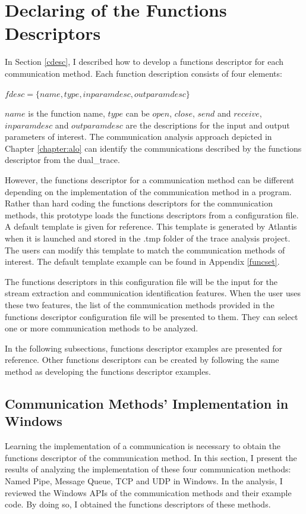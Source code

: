 \section{Declaring of the Functions Descriptors}\label{functionset}
In Section \ref{cdesc}, I described how to develop a functions descriptor for each communication method. Each function description consists of four elements: 

$fdesc = \lbrace name, type, inparamdesc, outparamdesc \rbrace$

$name$ is the function name, $type$ can be $open$, $close$, $send$ and $receive$, $inparamdesc$ and $outparamdesc$ are the descriptions for the input and output parameters of interest. The communication analysis approach depicted in Chapter \ref{chapter:alo} can identify the communications described by the functions descriptor from the dual\_trace.

However, the functions descriptor for a communication method can be different depending on the implementation of the communication method in a program. Rather than hard coding the functions descriptors for the communication methods, this prototype loads the functions descriptors from a configuration file. A default template is given for reference. This template is generated by Atlantis when it is launched and stored in the .tmp folder of the trace analysis project. The users can modify this template to match the communication methods of interest. The default template example can be found in Appendix \ref{funcset}.

The functions descriptors in this configuration file will be the input for the stream extraction and communication identification features. When the user uses these two features, the list of the communication methods provided in the functions descriptor configuration file will be presented to them. They can select one or more communication methods to be analyzed. 

In the following subsections, functions descriptor examples are presented for reference. Other functions descriptors can be created by following the same method as developing the functions descriptor examples.

\subsection{Communication Methods' Implementation in Windows}\label{windows}
Learning the implementation of a communication is necessary to obtain the functions descriptor of the communication method. In this section, I present the results of analyzing the implementation of these four communication methods: Named Pipe, Message Queue, TCP and UDP in Windows. In the analysis, I reviewed the Windows APIs of the communication methods and their example code. By doing so, I obtained the functions descriptors of these methods. 

